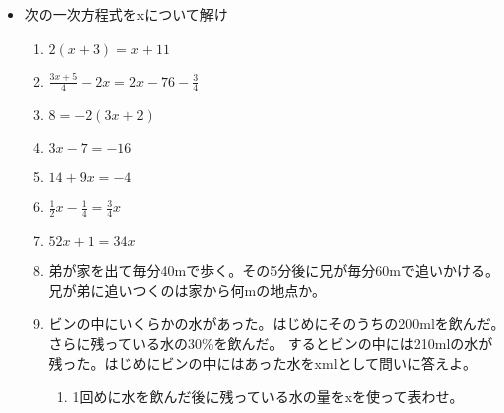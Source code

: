 \documentclass[a4paper,fleqn,papersize,15pt]{jsarticle}
\begin{document}
 \begin{itemize}
   \item 次の一次方程式をxについて解け
   \begin{enumerate}
\item $2(x+3)=x+11$ \begin{flushright}\framebox[8em]{\rule{0pt}{6ex}}\end{flushright} %
\item $\frac{3x+5}{4} -2x= {2x-7}{6} - \frac{3}{4}$ \begin{flushright}\framebox[8em]{\rule{0pt}{6ex}}\end{flushright} %
\item $8=-2(3x+2)$ \begin{flushright}\framebox[8em]{\rule{0pt}{6ex}}\end{flushright} %
\item $3x-7=-16$ \begin{flushright}\framebox[8em]{\rule{0pt}{6ex}}\end{flushright} %
\item $14+9x=-4$ \begin{flushright}\framebox[8em]{\rule{0pt}{6ex}}\end{flushright} %
\item $\frac{1}{2}x- \frac{1}{4} = \frac{3}{4} x$ \begin{flushright}\framebox[8em]{\rule{0pt}{6ex}}\end{flushright} %
\item $52x+1=34x$ \begin{flushright}\framebox[8em]{\rule{0pt}{6ex}}\end{flushright} %
\item 弟が家を出て毎分40mで歩く。その5分後に兄が毎分60mで追いかける。兄が弟に追いつくのは家から何mの地点か。 \vfill \begin{flushright}\framebox[8em]{\rule{0pt}{6ex}}\end{flushright} %
\item ビンの中にいくらかの水があった。はじめにそのうちの200mlを飲んだ。さらに残っている水の30\%を飲んだ。 するとビンの中には210mlの水が残った。はじめにビンの中にはあった水をxmlとして問いに答えよ。 \vfill \begin{flushright}\framebox[8em]{\rule{0pt}{6ex}}\end{flushright} %
\begin{enumerate}
\item 1回めに水を飲んだ後に残っている水の量をxを使って表わせ。 \vfill \begin{flushright}\framebox[8em]{\rule{0pt}{6ex}}\end{flushright} %

\end{enumerate}
\end{enumerate}
\end{itemize}
\end{document}
